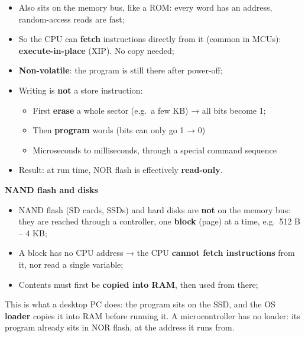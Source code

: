 \documentclass[a4paper,11pt]{article}
\begin{document}
\begin{itemize}

	\item
	      Also sits on the memory bus, like a ROM: every word has an address,
	      random-access reads are fast;
	\item
	      So the CPU can \textbf{fetch} instructions directly from it (common in MCUs):
	      \textbf{execute-in-place} (XIP). No copy needed;
	\item
	      \textbf{Non-volatile}: the program is still there after power-off;
	\item
	      Writing is \textbf{not} a store instruction:

	      \begin{itemize}

		      \item
		            First \textbf{erase} a whole sector (e.g.~a few KB) → all bits
		            become 1;
		      \item
		            Then \textbf{program} words (bits can only go 1 → 0)
		      \item
		            Microseconds to milliseconds, through a special command sequence
	      \end{itemize}
	\item
	      Result: at run time, NOR flash is effectively \textbf{read-only}.
\end{itemize}

\par\smallskip
\textbf{\textsf{NAND flash and disks}}

\begin{itemize}

	\item
	      NAND flash (SD cards, SSDs) and hard disks are \textbf{not} on the
	      memory bus: they are reached through a controller, one \textbf{block}
	      (page) at a time, e.g.~512 B -- 4 KB;
	\item
	      A block has no CPU address → the CPU \textbf{cannot fetch
		      instructions} from it, nor read a single variable;
	\item
	      Contents must first be \textbf{copied into RAM}, then used from there;
\end{itemize}

This is what a desktop PC does: the program sits on the SSD, and the
OS \textbf{loader} copies it into RAM before running it. A
microcontroller has no loader: its program already sits in NOR flash, at
the address it runs from.
\end{document}
